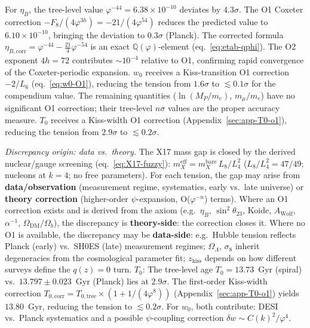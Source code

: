 \documentclass[12pt,a4paper]{article}
\begin{document}
For $\eta_B$, the tree-level value $\varphi^{-44} = 6.38 \times 10^{-10}$ deviates by $4.3\sigma$. The O1 Coxeter correction $-F_8/(4\varphi^{3h}) = -21/(4\varphi^{54})$ reduces the predicted value to $6.10 \times 10^{-10}$, bringing the deviation to $0.3\sigma$ (Planck). The corrected formula $\eta_{B,\text{corr}} = \varphi^{-44} - \tfrac{21}{4}\varphi^{-54}$ is an exact $\mathbb{Q}(\varphi)$-element (eq.~\ref{eq:etab-qphi}). The O2 exponent $4h = 72$ contributes $\sim 10^{-4}$ relative to O1, confirming rapid convergence of the Coxeter-periodic expansion.
$w_0$ receives a Kiss-transition O1 correction $-2/L_6$ (eq.~\ref{eq:w0-O1}), reducing the tension from $1.6\sigma$ to $\lesssim 0.1\sigma$ for the compendium value. The remaining quantities ($\ln(M_P/m_e)$, $m_\mu/m_e$) have no significant O1 correction; their tree-level $n\sigma$ values are the proper accuracy measure. $T_0$ receives a Kiss-width O1 correction (Appendix~\ref{sec:app-T0-o1}), reducing the tension from $2.9\sigma$ to $\lesssim 0.2\sigma$.

\medskip
\noindent\textit{Discrepancy origin: data vs.\ theory.}
The X17 mass gap is closed by the derived nuclear/gauge screening (eq.~\ref{eq:X17-fuzzy}): $m_X^{\mathrm{eff}} = m_X^{\mathrm{bare}}\,L_8/L_4^2$ ($L_8/L_4^2 = 47/49$; nucleons at $k=4$; no free parameters).
For each tension, the gap may arise from \textbf{data/observation} (measurement regime, systematics, early vs.\ late universe) or \textbf{theory correction} (higher-order $\psi$-expansion, O($\varphi^{-n}$) terms). Where an O1 correction exists and is derived from the axiom (e.g.\ $\eta_B$, $\sin^2\theta_{23}$, Koide, $A_{\mathrm{Wolf}}$, $\alpha^{-1}$, $\Omega_{\mathrm{DM}}/\Omega_b$), the discrepancy is \textbf{theory-side}: the correction closes it. Where no O1 is available, the discrepancy may be \textbf{data-side}: e.g.\ Hubble tension reflects Planck (early) vs.\ SH0ES (late) measurement regimes; $\Omega_\Lambda$, $\sigma_8$ inherit degeneracies from the cosmological parameter fit; $z_{\mathrm{kiss}}$ depends on how different surveys define the $q(z)=0$ turn. \textbf{$T_0$}: The tree-level age $T_0 = 13.73$~Gyr (spiral) vs.\ $13.797 \pm 0.023$~Gyr (Planck) lies at $2.9\sigma$. The first-order Kiss-width correction $T_{0,\mathrm{corr}} = T_{0,\mathrm{tree}} \times (1 + 1/(4\varphi^8))$ (Appendix~\ref{sec:app-T0-o1}) yields $13.80$~Gyr, reducing the tension to $\lesssim 0.2\sigma$. For $w_0$, both contribute: DESI vs.\ Planck systematics and a possible $\psi$-coupling correction $\delta w \sim C(k)^2/\varphi^4$.
\end{document}
